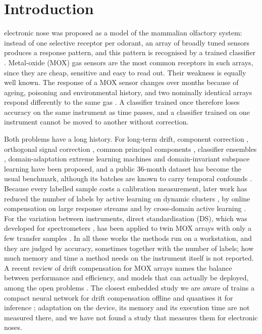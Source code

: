 \documentclass[journal,twoside,web]{ieeecolor}
\begin{document}
\section{Introduction}
 electronic nose was proposed as a model of the mammalian olfactory system: instead of one selective receptor per odorant, an array of broadly tuned sensors produces a response pattern, and this pattern is recognised by a trained classifier \cite{persaud}. Metal-oxide (MOX) gas sensors are the most common receptors in such arrays, since they are cheap, sensitive and easy to read out. Their weakness is equally well known. The response of a MOX sensor changes over months because of ageing, poisoning and environmental history, and two nominally identical arrays respond differently to the same gas \cite{marco}. A classifier trained once therefore loses accuracy on the same instrument as time passes, and a classifier trained on one instrument cannot be moved to another without correction.

Both problems have a long history. For long-term drift, component correction \cite{artursson}, orthogonal signal correction \cite{padilla}, common principal components \cite{ziyatdinov}, classifier ensembles \cite{vergara}, domain-adaptation extreme learning machines \cite{zhang} and domain-invariant subspace learning \cite{mida} have been proposed, and a public 36-month dataset \cite{vergara,rodriguez} has become the usual benchmark, although its batches are known to carry temporal confounds \cite{dennler}. Because every labelled sample costs a calibration measurement, later work has reduced the number of labels by active learning on dynamic clusters \cite{liu2019}, by online compensation on large response streams \cite{cao2021} and by cross-domain active learning \cite{sun2022}. For the variation between instruments, direct standardisation (DS), which was developed for spectrometers \cite{wang}, has been applied to twin MOX arrays with only a few transfer samples \cite{fonollosa}. In all these works the methods run on a workstation, and they are judged by accuracy, sometimes together with the number of labels; how much memory and time a method needs on the instrument itself is not reported. A recent review of drift compensation for MOX arrays names the balance between performance and efficiency, and models that can actually be deployed, among the open problems \cite{li2026}. The closest embedded study we are aware of trains a compact neural network for drift compensation offline and quantises it for inference \cite{krayden}; adaptation on the device, its memory and its execution time are not measured there, and we have not found a study that measures them for electronic noses.
\end{document}
